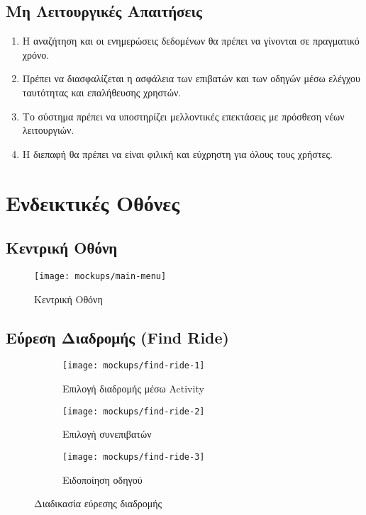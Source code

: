 \subsection{Μη Λειτουργικές Απαιτήσεις}

\begin{enumerate}
    \item Η αναζήτηση και οι ενημερώσεις δεδομένων θα πρέπει να γίνονται σε πραγματικό χρόνο.
    \item Πρέπει να διασφαλίζεται η ασφάλεια των επιβατών και των οδηγών μέσω ελέγχου ταυτότητας
          και επαλήθευσης χρηστών.
    \item Το σύστημα πρέπει να υποστηρίζει μελλοντικές επεκτάσεις με πρόσθεση νέων λειτουργιών.
    \item Η διεπαφή θα πρέπει να είναι φιλική και εύχρηστη για όλους τους χρήστες.
\end{enumerate}

\newpage

\section{Ενδεικτικές Οθόνες}

\subsection{Κεντρική Οθόνη}

\begin{figure}[H]
    \centering
    \texttt{[image: mockups/main-menu]}
    \caption{Κεντρική Οθόνη}
\end{figure}

\subsection{Εύρεση Διαδρομής (Find Ride)}

\begin{figure}[H]
    \centering
    \begin{subfigure}[b]{0.28\textwidth}
        \texttt{[image: mockups/find-ride-1]}
        \caption{Επιλογή διαδρομής μέσω Activity}
    \end{subfigure}
    \hfill
    \begin{subfigure}[b]{0.28\textwidth}
        \texttt{[image: mockups/find-ride-2]}
        \caption{Επιλογή συνεπιβατών}
    \end{subfigure}
    \hfill
    \begin{subfigure}[b]{0.28\textwidth}
        \texttt{[image: mockups/find-ride-3]}
        \caption{Ειδοποίηση οδηγού}
    \end{subfigure}
    \caption{Διαδικασία εύρεσης διαδρομής}
\end{figure}

